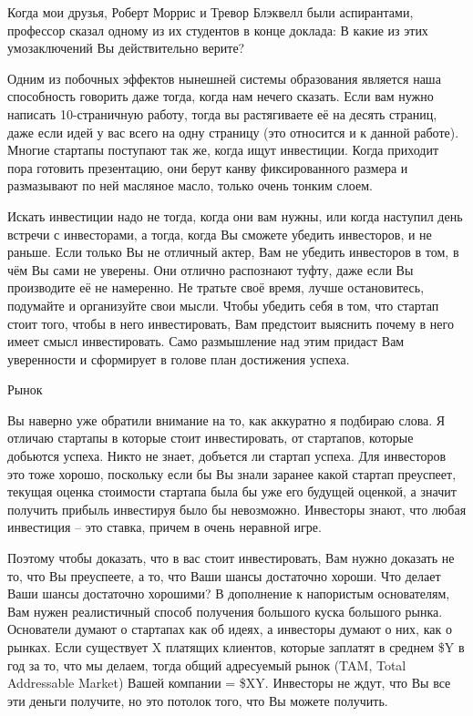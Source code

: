 \documentclass[ebook,12pt,oneside,openany]{memoir}
\begin{document}
Когда мои друзья, Роберт Моррис и Тревор Блэквелл были аспирантами,
профессор сказал одному из их студентов в конце доклада: В какие из
этих умозаключений Вы действительно верите?

Одним из побочных эффектов нынешней системы образования является наша
способность говорить даже тогда, когда нам нечего сказать. Если вам
нужно написать 10-страничную работу, тогда вы растягиваете её на
десять страниц, даже если идей у вас всего на одну страницу (это
относится и к данной работе). Многие стартапы поступают так же, когда
ищут инвестиции. Когда приходит пора готовить презентацию, они берут
канву фиксированного размера и размазывают по ней масляное масло,
только очень тонким слоем.

Искать инвестиции надо не тогда, когда они вам нужны, или когда
наступил день встречи с инвесторами, а тогда, когда Вы сможете убедить
инвесторов, и не раньше. Если только Вы не отличный актер, Вам не
убедить инвесторов в том, в чём Вы сами не уверены. Они отлично
распознают туфту, даже если Вы производите её не намеренно. Не тратьте
своё время, лучше остановитесь, подумайте и организуйте свои мысли.
Чтобы убедить себя в том, что стартап стоит того, чтобы в него
инвестировать, Вам предстоит выяснить почему в него имеет смысл
инвестировать. Само размышление над этим придаст Вам уверенности и
сформирует в голове план достижения успеха.

Рынок

Вы наверно уже обратили внимание на то, как аккуратно я подбираю
слова. Я отличаю стартапы в которые стоит инвестировать, от стартапов,
которые добьются успеха. Никто не знает, добъется ли стартап успеха.
Для инвесторов это тоже хорошо, поскольку если бы Вы знали заранее
какой стартап преуспеет, текущая оценка стоимости стартапа была бы уже
его будущей оценкой, а значит получить прибыль инвестируя было бы
невозможно. Инвесторы знают, что любая инвестиция – это ставка, причем
в очень неравной игре.

Поэтому чтобы доказать, что в вас стоит инвестировать, Вам нужно
доказать не то, что Вы преуспеете, а то, что Ваши шансы достаточно
хороши. Что делает Ваши шансы достаточно хорошими? В дополнение к
напористым основателям, Вам нужен реалистичный способ получения
большого куска большого рынка. Основатели думают о стартапах как об
идеях, а инвесторы думают о них, как о рынках. Если существует X
платящих клиентов, которые заплатят в среднем \$Y в год за то, что мы
делаем, тогда общий адресуемый рынок (TAM, Total Addressable Market)
Вашей компании = \$XY. Инвесторы не ждут, что Вы все эти деньги
получите, но это потолок того, что Вы можете получить.
\end{document}
